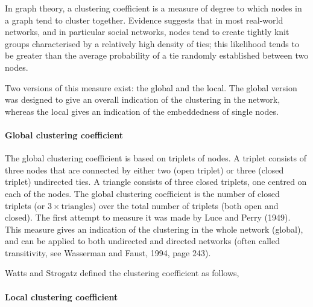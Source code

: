       In graph theory, a clustering coefficient is a measure of degree to which nodes in a graph tend to cluster together. Evidence suggests that in most real-world networks, and in particular social networks, nodes tend to create tightly knit groups characterised by a relatively high density of ties; this likelihood tends to be greater than the average probability of a tie randomly established between two nodes\cite{HollandLeinhardt1971,WattsStrogatz1998}.
           
      Two versions of this measure exist: the global and the local. The global version was designed to give an overall indication of the clustering in the network, whereas the local gives an indication of the embeddedness of single nodes.
          
      \paragraph{Global clustering coefficient}
            
        The global clustering coefficient is based on triplets of nodes. A triplet consists of three nodes that are connected by either two (open triplet) or three (closed triplet) undirected ties. A triangle consists of three closed triplets, one centred on each of the nodes. The global clustering coefficient is the number of closed triplets (or $3 \times \mbox{triangles}$) over the total number of triplets (both open and closed). The first attempt to measure it was made by Luce and Perry (1949)\cite{LucePerry1949}. This measure gives an indication of the clustering in the whole network (global), and can be applied to both undirected and directed networks (often called transitivity, see Wasserman and Faust, 1994, page 243\cite{WassermanFaust1994}).
              
        Watts and Strogatz defined the clustering coefficient as follows, 
              
      \paragraph{Local clustering coefficient}
              
